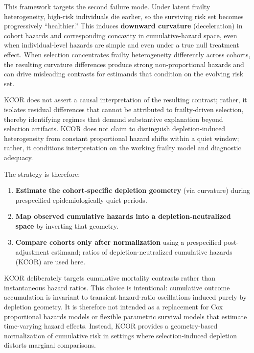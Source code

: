\documentclass[
]{article}
\providecommand{\tightlist}{%
  \setlength{\itemsep}{0pt}\setlength{\parskip}{0pt}}
\begin{document}
This framework targets the second failure mode. Under latent frailty
heterogeneity, high-risk individuals die earlier, so the surviving risk
set becomes progressively ``healthier.'' This induces \textbf{downward
curvature} (deceleration) in cohort hazards and corresponding concavity
in cumulative-hazard space, even when individual-level hazards are
simple and even under a true null treatment effect. When selection
concentrates frailty heterogeneity differently across cohorts, the
resulting curvature differences produce strong non-proportional hazards
and can drive misleading contrasts for estimands that condition on the
evolving risk set.

KCOR does not assert a causal interpretation of the resulting contrast;
rather, it isolates residual differences that cannot be attributed to
frailty-driven selection, thereby identifying regimes that demand
substantive explanation beyond selection artifacts. KCOR does not claim
to distinguish depletion-induced heterogeneity from constant
proportional hazard shifts within a quiet window; rather, it conditions
interpretation on the working frailty model and diagnostic adequacy.

The strategy is therefore:

\begin{enumerate}
\def\labelenumi{\arabic{enumi}.}
\tightlist
\item
  \textbf{Estimate the cohort-specific depletion geometry} (via
  curvature) during prespecified epidemiologically quiet periods.
\item
  \textbf{Map observed cumulative hazards into a depletion-neutralized
  space} by inverting that geometry.
\item
  \textbf{Compare cohorts only after normalization} using a prespecified
  post-adjustment estimand; ratios of depletion-neutralized cumulative
  hazards (KCOR) are used here.
\end{enumerate}

KCOR deliberately targets cumulative mortality contrasts rather than
instantaneous hazard ratios. This choice is intentional: cumulative
outcome accumulation is invariant to transient hazard-ratio oscillations
induced purely by depletion geometry. It is therefore not intended as a
replacement for Cox proportional hazards models or flexible parametric
survival models that estimate time-varying hazard effects. Instead, KCOR
provides a geometry-based normalization of cumulative risk in settings
where selection-induced depletion distorts marginal comparisons.
\end{document}
